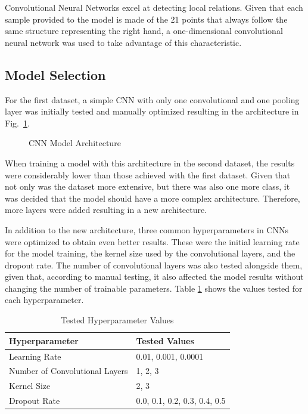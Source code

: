 Convolutional Neural Networks excel at detecting local relations. Given that each sample provided to the model is made of the 21 points that always follow the same structure representing the right hand, a one-dimensional convolutional neural network was used to take advantage of this characteristic.

\subsection{Model Selection}

For the first dataset, a simple CNN with only one convolutional and one pooling layer was initially tested and manually optimized resulting in the architecture in Fig.~\ref{fig:cnn_architecture_dataset1}.

\begin{figure}[H]
    \centering
    {\fontsize{10}{12}\selectfont}
    \caption[CNN Model Architecture]{CNN Model Architecture}
    \label{fig:cnn_architecture_dataset1}
\end{figure}

When training a model with this architecture in the second dataset, the results were considerably lower than those achieved with the first dataset. Given that not only was the dataset more extensive, but there was also one more class, it was decided that the model should have a more complex architecture. Therefore, more layers were added resulting in a new architecture.

In addition to the new architecture, three common hyperparameters in CNNs were optimized to obtain even better results. These were the initial learning rate for the model training, the kernel size used by the convolutional layers, and the dropout rate. The number of convolutional layers was also tested alongside them, given that, according to manual testing, it also affected the model results without changing the number of trainable parameters. Table \ref{table:cnn_hyperparameters} shows the values tested for each hyperparameter.

\begin{table}[H]
    \centering
    \caption{Tested Hyperparameter Values}
    \label{table:cnn_hyperparameters}
    \begin{tabular}{|l|l|}
        \hline
        Hyperparameter & Tested Values \\
        \hline
        Learning Rate & 0.01, 0.001, 0.0001 \\
        \hline
        Number of Convolutional Layers & 1, 2, 3 \\
        \hline
        Kernel Size & 2, 3 \\
        \hline
        Dropout Rate & 0.0, 0.1, 0.2, 0.3, 0.4, 0.5 \\
        \hline
    \end{tabular}
\end{table}

